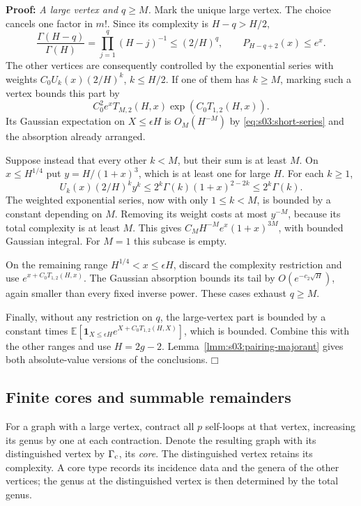 \documentclass[a4paper,10pt]{article}
\numberwithin{equation}{section}
\theoremstyle{paperplain}
\theoremstyle{paperremark}
\theoremstyle{paperplain}
\newenvironment{prf}{\noindent \textbf{Proof: }}{\hfill $\mdlgwhtsquare$\par\addvspace{0.5\baselineskip}}
\begin{document}
\begin{prf}
\smallskip\noindent
\emph{A large vertex and $q\geq M$.}
Mark the unique large vertex. The choice cancels one factor in
$m!$. Since its complexity is $H-q>H/2$,
\[
\frac{\Gamma(H-q)}{\Gamma(H)}
=\prod_{j=1}^q(H-j)^{-1}\leq(2/H)^q,
\qquad P_{H-q+2}(x)\leq e^x.
\]
The other vertices are consequently controlled by the exponential
series with weights $C_0U_k(x)(2/H)^k$, $k\leq H/2$.
If one of them has $k\geq M$, marking such a vertex bounds this
part by
\[
C_0^2e^x T_{M,2}(H,x)\exp(C_0T_{1,2}(H,x)).
\]
Its Gaussian expectation on $X\leq\epsilon H$ is $O_M(H^{-M})$
by \eqref{eq:s03:short-series} and the absorption already arranged.

Suppose instead that every other $k<M$, but their sum is at least
$M$. On $x\leq H^{1/4}$ put $y=H/(1+x)^3$, which is at least
one for large $H$. For each $k\geq1$,
\[
U_k(x)(2/H)^ky^k
\leq2^k\Gamma(k)(1+x)^{2-2k}
\leq2^k\Gamma(k).
\]
The weighted exponential series, now with only $1\leq k<M$, is
bounded by a constant depending on $M$. Removing its weight costs
at most $y^{-M}$, because its total complexity is at least $M$.
This gives
$C_MH^{-M}e^x(1+x)^{3M}$, with bounded Gaussian integral.
For $M=1$ this subcase is empty.

On the remaining range $H^{1/4}<x\leq\epsilon H$, discard the
complexity restriction and use
$e^{x+C_0T_{1,2}(H,x)}$. The Gaussian absorption bounds its tail
by $O(e^{-c_2\sqrt H})$, again smaller than every fixed inverse
power. These cases exhaust $q\geq M$.

Finally, without any restriction on $q$, the large-vertex part is
bounded by a constant times
$\mathbb E[\mathbf1_{X\leq\epsilon H}
 e^{X+C_0T_{1,2}(H,X)}]$, which is bounded.
Combine this with the other ranges and use $H=2g-2$.
Lemma~\ref{lmm:s03:pairing-majorant} gives both absolute-value
versions of the conclusions.
\end{prf}

\subsection{Finite cores and summable remainders}
\label{subsec:s03:04}

For a graph with a large vertex, contract all $p$ self-loops at that
vertex, increasing its genus by one at each contraction. Denote the
resulting graph with its distinguished vertex by $\Gamma_{\rm c}$,
its \emph{core}.
The distinguished vertex retains its complexity. A core type records
its incidence data and the genera of the other vertices; the genus
at the distinguished vertex is then determined by the total genus.
\end{document}
